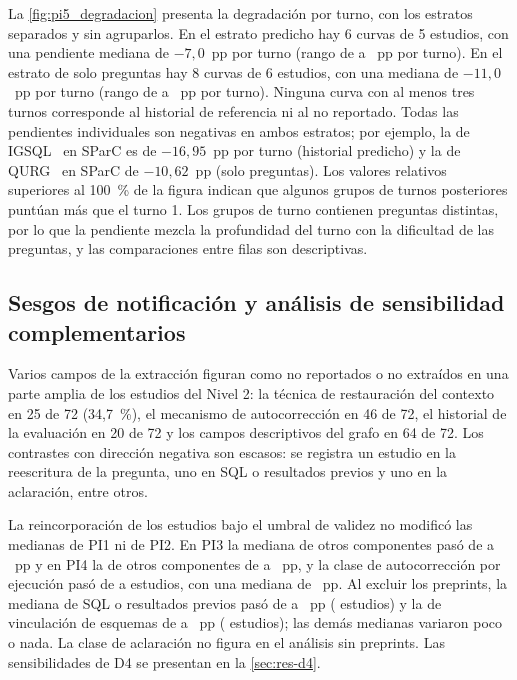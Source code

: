 La \cref{fig:pi5_degradacion} presenta la degradación por turno, con los estratos separados y sin agruparlos. En el estrato predicho hay 6 curvas de 5 estudios, con una pendiente mediana de $-7{,}0$~pp por turno (rango de \degPredMin{} a \degPredMax{}~pp por turno). En el estrato de solo preguntas hay 8 curvas de 6 estudios, con una mediana de $-11{,}0$~pp por turno (rango de \degSoloMin{} a \degSoloMax{}~pp por turno). Ninguna curva con al menos tres turnos corresponde al historial de referencia ni al no reportado. Todas las pendientes individuales son negativas en ambos estratos; por ejemplo, la de IGSQL~\cite{Cai2020IGSQL} en SParC es de $-16{,}95$~pp por turno (historial predicho) y la de QURG~\cite{Chai2023QURG} en SParC de $-10{,}62$~pp (solo preguntas). Los valores relativos superiores al 100~\% de la figura indican que algunos grupos de turnos posteriores puntúan más que el turno 1. Los grupos de turno contienen preguntas distintas, por lo que la pendiente mezcla la profundidad del turno con la dificultad de las preguntas, y las comparaciones entre filas son descriptivas.

\subsection{Sesgos de notificación y análisis de sensibilidad complementarios}
\label{sec:res-sesgos}

Varios campos de la extracción figuran como no reportados o no extraídos en una parte amplia de los estudios del Nivel 2: la técnica de restauración del contexto en 25 de 72 (34,7~\%), el mecanismo de autocorrección en 46 de 72, el historial de la evaluación en 20 de 72 y los campos descriptivos del grafo en 64 de 72. Los contrastes con dirección negativa son escasos: se registra un estudio en la reescritura de la pregunta, uno en SQL o resultados previos y uno en la aclaración, entre otros.

La reincorporación de los \nBajoUmbral{} estudios bajo el umbral de validez no modificó las medianas de PI1 ni de PI2. En PI3 la mediana de otros componentes pasó de \efPItresOtrosMed{} a \efPItresOtrosMedTodos{}~pp y en PI4 la de otros componentes de \efPIcuatroOtrosMed{} a \efPIcuatroOtrosMedTodos{}~pp, y la clase de autocorrección por ejecución pasó de \efAutocorrN{} a \efAutocorrNTodos{} estudios, con una mediana de \efAutocorrMedTodos{}~pp. Al excluir los preprints, la mediana de SQL o resultados previos pasó de \efSQLPrevMed{} a \efSQLPrevMedSinPre{}~pp (\efSQLPrevNSinPre{} estudios) y la de vinculación de esquemas de \efVincMed{} a \efVincMedSinPre{}~pp (\efVincNSinPre{} estudios); las demás medianas variaron poco o nada. La clase de aclaración no figura en el análisis sin preprints. Las sensibilidades de D4 se presentan en la \cref{sec:res-d4}.

